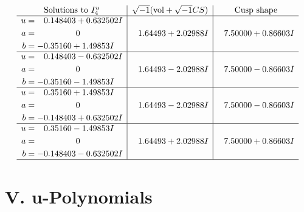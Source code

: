 \documentclass[1p]{elsarticle_modified}
\theoremstyle{definition}
\newcommand{\I}{\sqrt{-1}}
\begin{document}
$$\begin{array}{c|c|c}  
\text{Solutions to }I^u_{4}& \I (\text{vol} + \sqrt{-1}CS) & \text{Cusp shape}\\
 \hline 
\begin{aligned}
u &= \phantom{-}0.148403 + 0.632502 I \\
a &= \phantom{-0.000000 } 0 \\
b &= -0.35160 + 1.49853 I\end{aligned}
 & \phantom{-}1.64493 + 2.02988 I & \phantom{-}7.50000 + 0.86603 I \\ \hline\begin{aligned}
u &= \phantom{-}0.148403 - 0.632502 I \\
a &= \phantom{-0.000000 } 0 \\
b &= -0.35160 - 1.49853 I\end{aligned}
 & \phantom{-}1.64493 - 2.02988 I & \phantom{-}7.50000 - 0.86603 I \\ \hline\begin{aligned}
u &= \phantom{-}0.35160 + 1.49853 I \\
a &= \phantom{-0.000000 } 0 \\
b &= -0.148403 + 0.632502 I\end{aligned}
 & \phantom{-}1.64493 - 2.02988 I & \phantom{-}7.50000 - 0.86603 I \\ \hline\begin{aligned}
u &= \phantom{-}0.35160 - 1.49853 I \\
a &= \phantom{-0.000000 } 0 \\
b &= -0.148403 - 0.632502 I\end{aligned}
 & \phantom{-}1.64493 + 2.02988 I & \phantom{-}7.50000 + 0.86603 I\\
 \hline 
 \end{array}$$\newpage
\newpage\renewcommand{\arraystretch}{1}
\centering \section*{ V. u-Polynomials}
\end{document}
